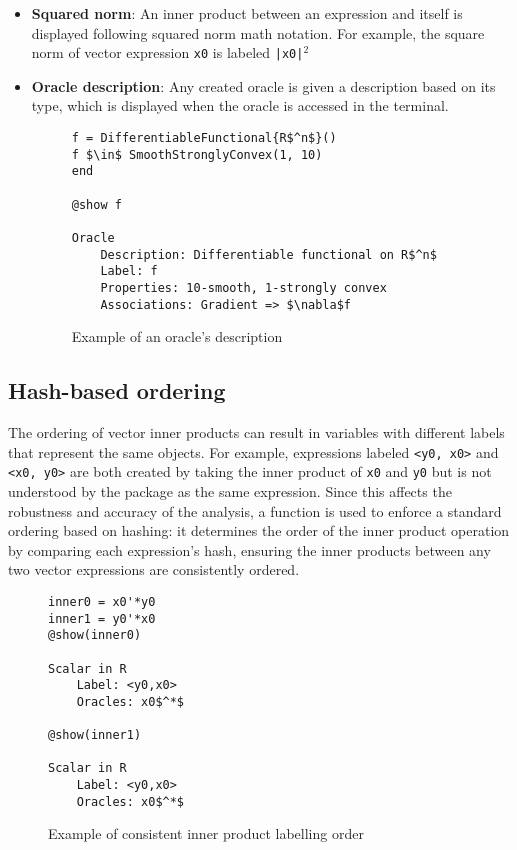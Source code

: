 \begin{itemize}
	\item \textbf{Squared norm}: An inner product between an expression and itself is displayed following squared norm math notation. For example, the square norm of vector expression \texttt{x0} is labeled \texttt{|x0|$^2$}
	
	\item \textbf{Oracle description}: Any created oracle is given a description based on its type, which is displayed when the oracle is accessed in the terminal.
	
\begin{figure}[!h]
	\begin{lstlisting}[mathescape]
f = DifferentiableFunctional{R$^n$}()
f $\in$ SmoothStronglyConvex(1, 10)
end

@show f

Oracle
	Description: Differentiable functional on R$^n$
	Label: f
	Properties: 10-smooth, 1-strongly convex
	Associations: Gradient => $\nabla$f
\end{lstlisting}
\caption{Example of an oracle's description}
\label{ex_description}
\end{figure}

\end{itemize}

\subsection*{Hash-based ordering}
The ordering of vector inner products can result in variables with different labels that represent the same objects. For example, expressions labeled \texttt{<y0, x0>} and \texttt{<x0, y0>} are both created by taking the inner product of \texttt{x0} and \texttt{y0} but is not understood by the package as the same expression. Since this affects the robustness and accuracy of the analysis, a function is used to enforce a standard ordering based on hashing: it determines the order of the inner product operation by comparing each expression's hash, ensuring the inner products between any two vector expressions are consistently ordered.

\begin{figure}[!h]
	\begin{lstlisting}[mathescape]
inner0 = x0'*y0
inner1 = y0'*x0
@show(inner0)

Scalar in R
	Label: <y0,x0>
	Oracles: x0$^*$

@show(inner1)

Scalar in R
	Label: <y0,x0>
	Oracles: x0$^*$

	\end{lstlisting}
	\caption{Example of consistent inner product labelling order}
	\label{ex_hashorder}
\end{figure}

